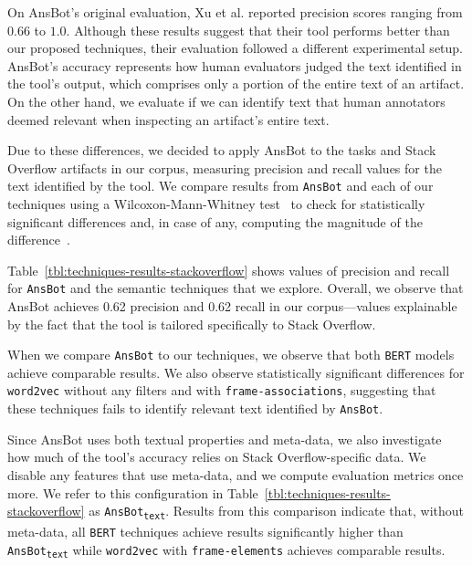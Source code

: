 On \acs{AnsBot}'s original evaluation, Xu et al. reported precision scores ranging from $0.66$ to $1.0$. 
Although these results suggest that their tool performs better than our proposed techniques, their evaluation followed a different experimental setup. 
\acs{AnsBot}'s accuracy represents how human evaluators judged the text identified in the tool's output, which comprises only a portion of the entire text of an artifact. On the other hand, 
we evaluate if we can identify text that human annotators deemed relevant when inspecting an artifact's entire text.



Due to these differences, we decided to apply \acs{AnsBot} to the tasks and Stack Overflow artifacts in our corpus, measuring precision and recall values for the text identified by the tool. 
We compare results from \texttt{AnsBot} and each of our techniques using
a Wilcoxon-Mann-Whitney test~\cite{mannWhitneyU} to check for statistically significant differences and, in case of any, computing the magnitude of the difference~\cite{cohen2013statistical}. 



Table~\ref{tbl:techniques-results-stackoverflow} shows values of precision and recall for  \texttt{AnsBot} and the semantic techniques that we explore. 
Overall, we observe that \acs{AnsBot} achieves 0.62 precision and 0.62 recall in our corpus---values explainable by the fact that the tool is tailored specifically to Stack Overflow.


When we compare \texttt{AnsBot} to our techniques, we observe that 
both \texttt{BERT} models achieve comparable results.
We also observe statistically significant differences for 
\texttt{word2vec} without any filters and with \texttt{frame-associations}, suggesting that these techniques
fails to identify relevant text identified by \texttt{AnsBot}.






Since \acs{AnsBot} uses both textual properties and meta-data, 
we also investigate how much of the tool's accuracy relies on Stack Overflow-specific data.
We disable any features that use meta-data, and we compute evaluation metrics once more.
We refer to this configuration in Table~\ref{tbl:techniques-results-stackoverflow} as \texttt{AnsBot\textsubscript{text}}.
Results from this comparison indicate that, without meta-data, all \texttt{BERT} techniques
achieve results 
significantly higher than  \texttt{AnsBot\textsubscript{text}}
while \texttt{word2vec} with \texttt{frame-elements} achieves comparable results.




